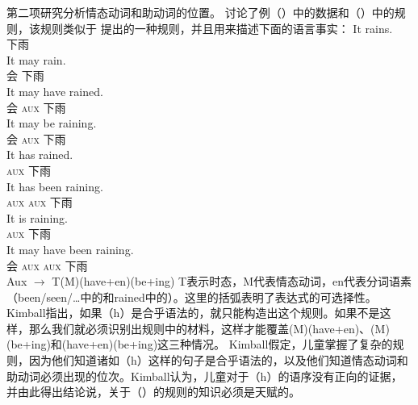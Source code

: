 第二项研究分析情态动词和助动词的位置。 \citet[--75]{Kimball73b-u}讨论了例（）中的数据和（）中的规则，该规则类似于 \citet[]{Chomsky57a}提出的一种规则，并且用来描述下面的语言事实：
\eal
\label{Aux-Beispiele}
\ex 
\gll It rains.\\
     \expl{} 下雨\\
\ex\label{It-may-rain} 
\gll It may rain.\\
     \expl{} 会 下雨\\
\ex 
\gll It may have rained.\\
     \expl{} 会 \textsc{aux} 下雨\\
\ex 
\gll It may be raining.\\
     \expl{} 会 \textsc{aux} 下雨\\
\ex 
\gll It has rained.\\
     \expl{} \textsc{aux} 下雨\\
\ex 
\gll It has been raining.\\
     \expl{} \textsc{aux} \textsc{aux} 下雨\\
\ex 
\gll It is raining.\\
     \expl{} \textsc{aux} 下雨\\
\ex\label{It-may-have-been-raining} 
\gll It may have been raining.\\
     \expl{} 会 \textsc{aux} \textsc{aux} 下雨\\
\zl
\ea
\label{Regel-Aux}
Aux $\to$ T(M)(have+en)(be+ing)
\z
T表示时态，M代表情态动词，en代表分词语素（been/seen/\ldots{}中的和rained中的）。这里的括弧表明了表达式的可选择性。Kimball指出，如果（h）是合乎语法的，就只能构造出这个规则。如果不是这样，那么我们就必须识别出规则中的材料，这样才能覆盖(M)(have+en)、(M)(be+ing)和(have+en)(be+ing)这三种情况。
Kimball假定，儿童掌握了复杂的规则，因为他们知道诸如（h）这样的句子是合乎语法的，以及他们知道情态动词和助动词必须出现的位次。Kimball认为，儿童对于（h）的语序没有正向的证据，并由此得出结论说，关于（）的规则的知识必须是天赋的。
